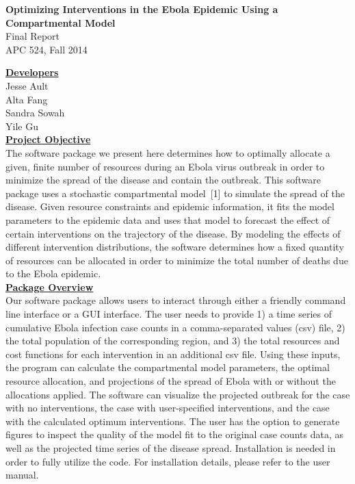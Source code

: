 \documentclass[11pt,letter]{article}
\begin{document}
\begin{center}
	\large\textbf{Optimizing Interventions in the Ebola Epidemic Using a Compartmental Model}\\
	\normalsize{Final Report\\APC 524, Fall 2014}
\end{center}

\underline{\textbf{Developers}}\vspace{0.5mm}\\Jesse Ault\\Alta Fang\\Sandra Sowah\\ Yile Gu\\

\underline{\textbf{Project Objective}}\vspace{0.5mm}\\
The software package we present here determines how to optimally allocate a given, finite number of resources during an Ebola virus outbreak in order to minimize the spread of the disease and contain the outbreak. This software package uses a stochastic compartmental model~[1] to simulate the spread of the disease. Given resource constraints and epidemic information, it fits the model parameters to the epidemic data and uses that model to forecast the effect of certain interventions on the trajectory of the disease. By modeling the effects of different intervention distributions, the software determines how a fixed quantity of resources can be allocated in order to minimize the total number of deaths due to the Ebola epidemic.\\

\underline{\textbf{Package Overview}}\vspace{0.5mm}\\
Our software package allows users to interact through either a friendly command line interface or a GUI interface. The user needs to provide 1) a time series of cumulative Ebola infection case counts in a comma-separated values (csv) file, 2) the total population of the corresponding region, and 3) the total resources and cost functions for each intervention in an additional csv file. Using these inputs, the program can calculate the compartmental model parameters, the optimal resource allocation, and projections of the spread of Ebola with or without the allocations applied. The software can visualize the projected outbreak for the case with no interventions, the case with user-specified interventions, and the case with the calculated optimum interventions. The user has the option to generate figures to inspect the quality of the model fit to the original case counts data, as well as the projected time series of the disease spread. Installation is needed in order to fully utilize the code. For installation details, please refer to the user manual.\\
\end{document}
